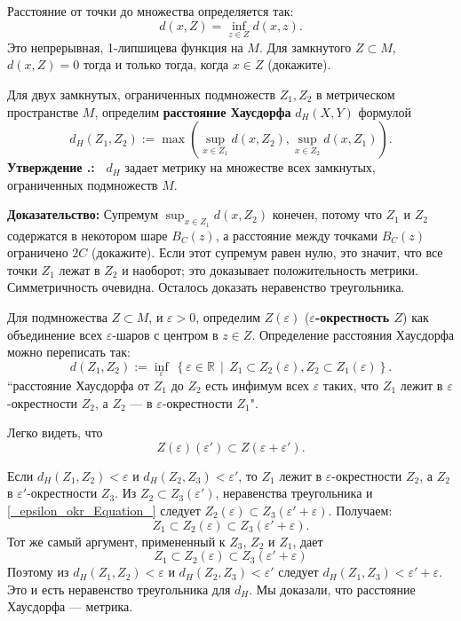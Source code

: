 \documentclass[12pt]{book}
\def\endproof{\hbox{\vrule width 5pt height 5pt depth 0pt}}
\renewcommand{\epsilon}{\varepsilon}
\def\R{{\mathbb R}}
\theoremstyle{upshape}
\theoremstyle{generic}
\theoremstyle{upshapenonumber}
\newtheorem{ukazanie}{Указание}[section]
\newcommand{\следствие}{%
     \refstepcounter{teorema}
     {\noindent\bf Следствие \thechapter.\arabic{teorema}:\ }}
\newcommand{\пример}{%
     \refstepcounter{teorema}
     {\noindent\bf Пример \thechapter.\arabic{teorema}:\ }}
\newcommand{\лемма}{%
     \refstepcounter{teorema}
     {\noindent\bf Лемма \thechapter.\arabic{teorema}:\ }}
\newcommand{\теорема}{%
     \refstepcounter{teorema}
     {\noindent\bf Теорема \thechapter.\arabic{teorema}:\ }}
\newcommand{\утверждение}{%
     \refstepcounter{teorema}
     {\noindent\bf Утверждение \thechapter.\arabic{teorema}:\ }}
\def\хфилл{\hfill}
\def\ноиндент{\noindent}
\def\бф{\bf}
\def\указание{\begin{ukazanie}}
\begin{document}
Расстояние от точки до множества определяется так:
\[
d(x, Z) = \inf_{z\in Z} d(x, z).
\]
Это непрерывная, 1-липшицева функция на $M$.
Для замкнутого $Z\subset M$, $d(x, Z)=0$ тогда и только
тогда, когда $x \in Z$ (докажите). 

Для двух замкнутых, ограниченных 
подмножеств $Z_1, Z_2$ в метрическом
пространстве $M$, определим {\bf расстояние Хаусдорфа}
$d_H(X,Y)$ формулой
\[
  d_H(Z_1, Z_2):= \max \left( \sup_{x\in Z_1} d(x, Z_2), 
 \sup_{x\in Z_2} d(x, Z_1)\right).
\]
\утверждение
$d_H$ задает метрику на множестве всех 
замкнутых, ограниченных подмножеств $M$.

\хфилл

\ноиндент
{\бф Доказательство:} 
Супремум $\sup_{x\in Z_1} d(x, Z_2)$
конечен, потому что $Z_1$ и $Z_2$ содержатся в некотором
шаре $B_C(z)$, а расстояние между точками $B_C(z)$
ограничено $2C$ (докажите). Если этот супремум равен нулю,
это значит, что все точки $Z_1$ лежат в $Z_2$ и наоборот;
это доказывает положительность метрики. Симметричность
очевидна. Осталось доказать неравенство треугольника.

Для подмножества $Z\subset M$, и $\epsilon> 0$, 
определим $Z(\epsilon)$ ({\bf $\epsilon$-окрестность $Z$}) 
как объединение всех $\epsilon$-шаров с центром в $z\in Z$. Определение
расстояния Хаусдорфа можно переписать так:
\[
  d(Z_1, Z_2):= \inf_\epsilon \ \left \{ \epsilon \in \R\ \  | \ \
  Z_1\subset Z_2(\epsilon), Z_2 \subset Z_1(\epsilon)\right\}.
\]
``расстояние Хаусдорфа от $Z_1$ до $Z_2$ есть инфимум всех
$\epsilon$ таких, что $Z_1$ лежит в $\epsilon$-окрестности
$Z_2$, а $Z_2$ --- в $\epsilon$-окрестности $Z_1$".

Легко видеть, что 
\begin{equation}\label{_epsilon_okr_Equation_}
Z(\epsilon)(\epsilon') \subset Z(\epsilon+\epsilon').
\end{equation}

Если $d_H(Z_1, Z_2) < \epsilon$ и $d_H(Z_2, Z_3) < \epsilon'$,
то $Z_1$ лежит в $\epsilon$-окрестности $Z_2$, а $Z_2$ в 
$\epsilon'$-окрестности $Z_3$. Из 
$Z_2\subset Z_3(\epsilon')$, неравенства  
треугольника и \eqref{_epsilon_okr_Equation_} следует
$Z_2(\epsilon) \subset Z_3(\epsilon'+ \epsilon)$.
Получаем: \[ Z_1\subset Z_2(\epsilon)\subset Z_3(\epsilon'+ \epsilon).\]
Тот же самый аргумент, примененный к $Z_3$, $Z_2$ и $Z_1$,
дает \[ Z_1\subset Z_2(\epsilon)\subset Z_3(\epsilon'+ \epsilon)\]
Поэтому из $d_H(Z_1, Z_2) < \epsilon$ и $d_H(Z_2, Z_3) < \epsilon'$
следует $d_H(Z_1, Z_3)< \epsilon'+ \epsilon$. Это и есть
неравенство треугольника для $d_H$. Мы доказали,
что расстояние Хаусдорфа --- метрика. \endproof
\end{document}
